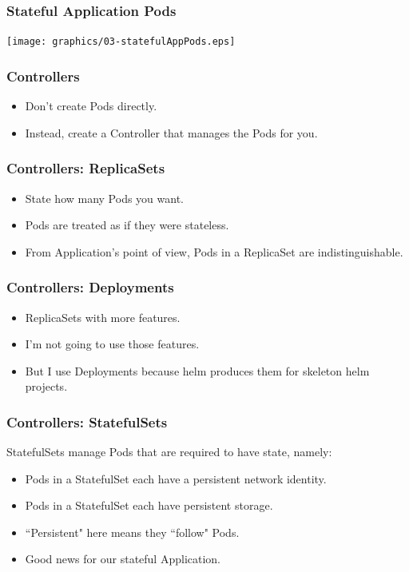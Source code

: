     \begin{frame}
        \frametitle{Stateful Application Pods}
        \texttt{[image: graphics/03-statefulAppPods.eps]}
    \end{frame}

    \begin{frame}
        \frametitle{Controllers}
        \begin{itemize}
            \item Don't create Pods directly.
            \item Instead, create a Controller that manages the Pods for you.
        \end{itemize}
    \end{frame}

    \begin{frame}
        \frametitle{Controllers: ReplicaSets}
        \begin{itemize}
            \item State how many Pods you want.\pause
            \item Pods are treated as if they were stateless.\pause
            \item From Application's point of view, Pods in a ReplicaSet are indistinguishable.
        \end{itemize}
    \end{frame}

    \begin{frame}
        \frametitle{Controllers: Deployments}
        \begin{itemize}
            \item ReplicaSets with more features.\pause
            \item I'm not going to use those features.\pause
            \item But I use Deployments because helm produces them for skeleton helm projects.
        \end{itemize}
    \end{frame}

    \begin{frame}
        \frametitle{Controllers: StatefulSets}
        StatefulSets manage Pods that are required to have state, namely:\pause
        \begin{itemize}
            \item Pods in a StatefulSet each have a persistent network identity.\pause
            \item Pods in a StatefulSet each have persistent storage.\pause
            \item ``Persistent" here means they ``follow" Pods.\pause
            \item Good news for our stateful Application.
        \end{itemize}
    \end{frame}

